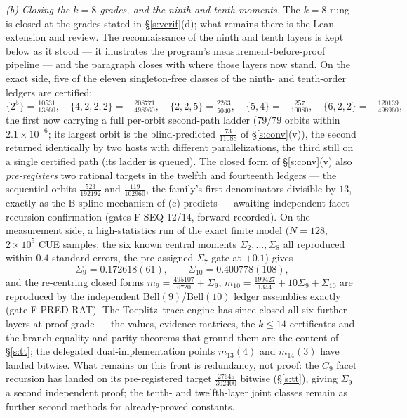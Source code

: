 \documentclass[11pt]{article}
\numberwithin{equation}{section}
\theoremstyle{definition}
\theoremstyle{remark}
\begin{document}
\emph{(b) Closing the $k=8$ grades, and the ninth and tenth
moments.} The $k=8$ rung is closed at the grades stated in
\S\ref{s:verif}(d); what remains there is the Lean extension
and review. The reconnaissance of the ninth and tenth
layers is kept below as it stood --- it illustrates the
program's measurement-before-proof pipeline --- and the
paragraph closes with where those layers now stand. On the
exact side, five of the eleven singleton-free classes of the
ninth- and tenth-order ledgers are certified:
\[
\{2^5\}=\tfrac{10531}{13860},\quad
\{4,2,2,2\}=-\tfrac{208771}{498960},\quad
\{2,2,5\}=\tfrac{2263}{5040},\quad
\{5,4\}=-\tfrac{257}{10080},\quad
\{6,2,2\}=-\tfrac{120139}{498960},
\]
the first now carrying a full per-orbit second-path ladder
($79/79$ orbits within $2.1\times10^{-6}$; its largest orbit is
the blind-predicted $\tfrac{73}{11088}$ of \S\ref{s:conv}(v)),
the second returned
identically by two hosts with different parallelizations,
the third still on a single certified path (its ladder is
queued). The closed form of \S\ref{s:conv}(v) also
\emph{pre-registers} two rational targets in the twelfth and
fourteenth ledgers --- the sequential orbits
$\tfrac{523}{192192}$ and $\tfrac{119}{102960}$, the family's
first denominators divisible by $13$, exactly as the B-spline
mechanism of (e) predicts --- awaiting independent
facet-recursion confirmation (gates F-SEQ-12/14,
forward-recorded). On
the measurement side, a high-statistics run of the exact
finite model ($N=128$, $2\times10^{5}$ CUE samples; the six
known central moments $\Sigma_2,\dots,\Sigma_8$ all reproduced
within $0.4$ standard errors, the pre-assigned $\Sigma_7$ gate
at $+0.1$) gives
\[
\Sigma_9=0.172618(61),\qquad
\Sigma_{10}=0.400778(108),
\]
and the re-centring closed forms
$m_9=\tfrac{495107}{6720}+\Sigma_9$,
$m_{10}=\tfrac{199427}{1344}+10\Sigma_9+\Sigma_{10}$ are
reproduced by the independent Bell$(9)$/Bell$(10)$ ledger
assemblies exactly (gate F-PRED-RAT). The Toeplitz--trace
engine has since closed all six further layers at proof
grade --- the values, evidence matrices, the $k\le14$
certificates and the branch-equality and parity theorems
that ground them are the content of \S\ref{s:tt}; the
delegated dual-implementation points $m_{13}(4)$ and
$m_{14}(3)$ have landed bitwise. What remains on this front
is redundancy, not proof: the $C_9$ facet recursion has
landed on its pre-registered target $\tfrac{27649}{302400}$
bitwise (\S\ref{s:tt}), giving $\Sigma_9$ a second
independent proof; the tenth- and twelfth-layer joint
classes remain as further second methods for already-proved
constants.
\end{document}
